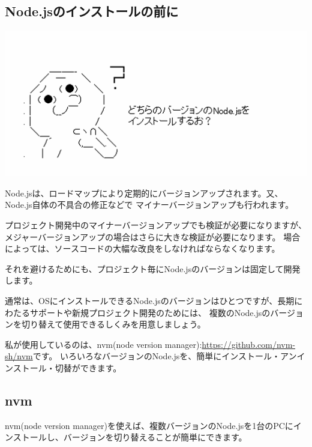 \subsection{Node.jsのインストールの前に}
\keeplastskip{
  \label{sec:1-1-2}
  \par\nobreak
}
\begin{reviewimage}%
\includegraphics[width=1.0\maxwidth]{./images/01-createDevEnv/y01_whichNodeVer.png}%
\label{image:01-createDevEnv:y01_whichNodeVer}
\end{reviewimage}

Node.jsは、ロードマップにより定期的にバージョンアップされます。又、Node.js自体の不具合の修正などで
マイナーバージョンアップも行われます。

プロジェクト開発中のマイナーバージョンアップでも検証が必要になりますが、
メジャーバージョンアップの場合はさらに大きな検証が必要になります。
場合によっては、ソースコードの大幅な改良をしなければならなくなります。

それを避けるためにも、プロジェクト毎にNode.jsのバージョンは固定して開発します。

通常は、OSにインストールできるNode.jsのバージョンはひとつですが、長期にわたるサポートや新規プロジェクト開発のためには、
複数のNode.jsのバージョンを切り替えて使用できるしくみを用意しましょう。

私が使用しているのは、nvm(node version manager):\url{https://github.com/nvm-sh/nvm}です。
いろいろなバージョンのNode.jsを、簡単にインストール・アンインストール・切替ができます。

\subsection{nvm}
\keeplastskip{
  \label{sec:1-1-3}
  \par\nobreak
}

nvm(node version manager)を使えば、複数バージョンのNode.jsを1台のPCにインストールし、バージョンを切り替えることが簡単にできます。

